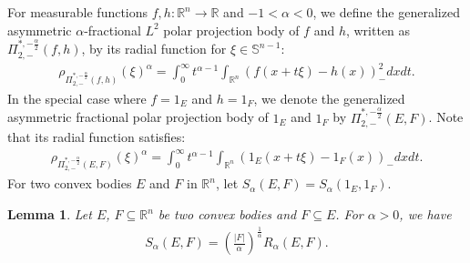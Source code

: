 \documentclass[preprint,12pt]{elsarticle}
\newtheorem{lem}{Lemma}
\begin{document}
For measurable functions $f,h:\mathbb{R}^{n}\rightarrow \mathbb{R}$ and $-1<\alpha<0$, we define the generalized asymmetric  $\alpha$-fractional $L^2$ polar projection body of $f$ and $h$, written as ${\Pi }_{2,-}^{*,-\frac{\alpha }{2} }(f,h)$, by its radial function for $\xi \in {\mathbb{S}}^{n-1} $:
\begin{eqnarray}
{{\rho}_{ {\Pi }_{2,-}^{*,-\frac{\alpha }{2} }(f,h)} (\xi)}^{\alpha }=\int_{0}^{\infty }{t}^{\alpha-1}\int_{\mathbb{R}^n}{\left(f\left ( x+t\xi \right ) -h(x)\right)}^{2} _{-}dxdt.	
\end{eqnarray}
In the special case where $f=1_{E}$ and $h=1_{F} $,  we denote the generalized asymmetric fractional polar projection body of $1_{E}$ and $1_{F}$ by ${\Pi}_{2,-}^{*,-\frac{\alpha }{2} }(E,F)$. Note that its radial function satisfies:
\begin{eqnarray}\label{67}
{{\rho}_{ {\Pi }_{2,-}^{*,-\frac{\alpha }{2} }(E,F)} (\xi)}^{\alpha }=\int_{0}^{\infty }{t}^{\alpha-1}\int_{\mathbb{R}^n}{\left(1_{E}(x+t\xi)-1_{F}(x)\right)}_{-}dxdt.
\end{eqnarray} 
For two convex bodies $E$ and $F$ in $ \mathbb{R}^n$, let ${S}_{\alpha }(E,F)={S}_{\alpha }(1_{E},1_{F})$.
\begin{lem}\label{L6.1}
Let $E$, $F\subseteq \mathbb{R}^n$ be two convex bodies and $F\subseteq E $. For $\alpha>0$, we have
\begin{eqnarray}\label{6.4}
{S}_{\alpha }(E,F)=\left(\frac{|F|}{\alpha }\right)^{\frac{1}{\alpha}}{R}_{\alpha }(E,F).
\end{eqnarray}
\end{lem}
\end{document}
